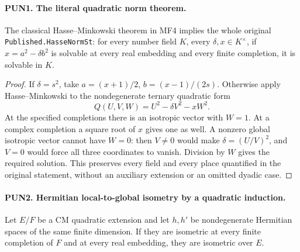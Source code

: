 \paragraph{PUN1. The literal quadratic norm theorem.}
\label{claim:PUN1}
The classical Hasse--Minkowski theorem in MF4 implies the whole
original \texttt{Published.HasseNormSt}: for every number field
\(K\), every \(\delta,x\in K^\times\), if
\(x=a^2-\delta b^2\) is solvable at every real embedding and every
finite completion, it is solvable in \(K\).

\begin{proof}
If \(\delta=s^2\), take
\(a=(x+1)/2\), \(b=(x-1)/(2s)\).  Otherwise apply
Hasse--Minkowski to the nondegenerate ternary quadratic form
\[
                  Q(U,V,W)=U^2-\delta V^2-xW^2.
 \tag{PUN.3}
\]
At the specified completions there is an isotropic vector with
\(W=1\).  At a complex completion a square root of \(x\) gives
one as well.  A nonzero global isotropic vector cannot have \(W=0\):
then \(V\ne0\) would make \(\delta=(U/V)^2\), and \(V=0\)
would force all three coordinates to vanish.  Division by \(W\)
gives the required solution.  This preserves every field and every
place quantified in the original statement, without an auxiliary
extension or an omitted dyadic case.
\end{proof}

\paragraph{PUN2. Hermitian local-to-global isometry by a quadratic induction.}
\label{claim:PUN2}
Let \(E/F\) be a CM quadratic extension and let \(h,h'\) be
nondegenerate Hermitian spaces of the same finite dimension.
If they are isometric at every finite completion of \(F\) and at
every real embedding, they are isometric over \(E\).

